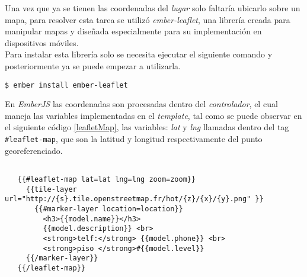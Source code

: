 Una vez que ya se tienen las coordenadas del \emph{lugar} solo faltaría ubicarlo sobre un mapa, para resolver esta tarea se utilizó \emph{ember-leaflet}, una librería creada para manipular mapas y diseñada especialmente  para su implementación en dispositivos móviles.\\

Para instalar esta librería solo se necesita ejecutar el siguiente comando y posteriormente ya se puede empezar a utilizarla.\\

\begin{verbatim}
$ ember install ember-leaflet
\end{verbatim}


En \emph{EmberJS} las coordenadas son procesadas dentro del \emph{controlador}, el cual maneja las variables implementadas en el \emph{template}, tal como se puede observar en el siguiente código \ref{leafletMap}, las variables: \emph{lat} y \emph{lng} llamadas dentro del tag \verb|#leaflet-map|, que son la latitud y longitud respectivamente del punto georeferenciado. \\


\newpage
\begin{center}
 \begin{lstlisting}[label=leafletMap,caption=Método para obtener la información de un lugar.]

   {{#leaflet-map lat=lat lng=lng zoom=zoom}}
     {{tile-layer url="http://{s}.tile.openstreetmap.fr/hot/{z}/{x}/{y}.png" }}
       {{#marker-layer location=location}}
         <h3>{{model.name}}</h3>
         {{model.description}} <br>
         <strong>telf:</strong> {{model.phone}} <br>
         <strong>piso </strong>#{{model.level}}
     {{/marker-layer}}
   {{/leaflet-map}}

 \end{lstlisting}
\end{center}

